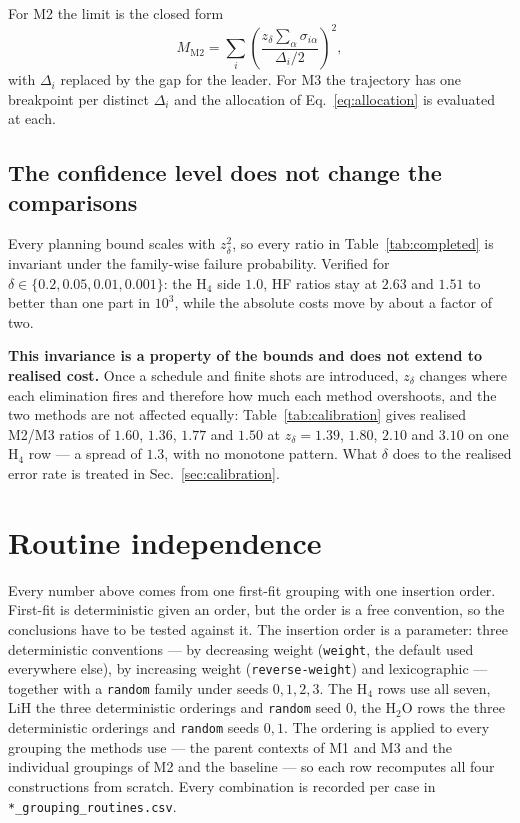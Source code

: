 \documentclass[10pt]{article}
\begin{document}
For M2 the limit is the closed form
\begin{equation}
  M_{\text{M2}}
  =\sum_i\left(\frac{z_\delta\sum_\alpha\sigma_{i\alpha}}{\Delta_i/2}\right)^{2},
  \label{eq:m2-exact}
\end{equation}
with $\Delta_i$ replaced by the gap for the leader. For M3 the trajectory has one
breakpoint per distinct $\Delta_i$ and the allocation of Eq.~\eqref{eq:allocation}
is evaluated at each.

\subsection{The confidence level does not change the comparisons}

Every planning bound scales with $z_\delta^2$, so every ratio in
Table~\ref{tab:completed} is invariant under the family-wise failure probability.
Verified for $\delta\in\{0.2,0.05,0.01,0.001\}$: the H$_4$ side $1.0$, HF ratios stay
at $2.63$ and $1.51$ to better than one part in $10^3$, while the absolute costs
move by about a factor of two.

\textbf{This invariance is a property of the bounds and does not extend to
realised cost.} Once a schedule and finite shots are introduced, $z_\delta$ changes
where each elimination fires and therefore how much each method overshoots, and
the two methods are not affected equally: Table~\ref{tab:calibration} gives
realised M2/M3 ratios of $1.60$, $1.36$, $1.77$ and $1.50$ at
$z_\delta=1.39$, $1.80$, $2.10$ and $3.10$ on one H$_4$ row --- a spread of $1.3$,
with no monotone pattern. What $\delta$ does to the realised error rate is treated
in Sec.~\ref{sec:calibration}.

\section{Routine independence}
\label{sec:routines}

Every number above comes from one first-fit grouping with one insertion order.
First-fit is deterministic given an order, but the order is a free convention, so
the conclusions have to be tested against it. The insertion order is a parameter:
three deterministic conventions --- by decreasing weight (\texttt{weight}, the
default used everywhere else), by increasing weight (\texttt{reverse-weight}) and
lexicographic --- together with a \texttt{random} family under seeds $0,1,2,3$.
The H$_4$ rows use all seven, LiH the three deterministic orderings and
\texttt{random} seed $0$, the H$_2$O rows the three deterministic orderings and
\texttt{random} seeds $0,1$. The ordering is applied to every grouping the
methods use --- the parent contexts of M1 and M3 and the individual groupings of M2
and the baseline --- so each row recomputes all four constructions from scratch.
Every combination is recorded per case in \texttt{*\_grouping\_routines.csv}.
\end{document}
